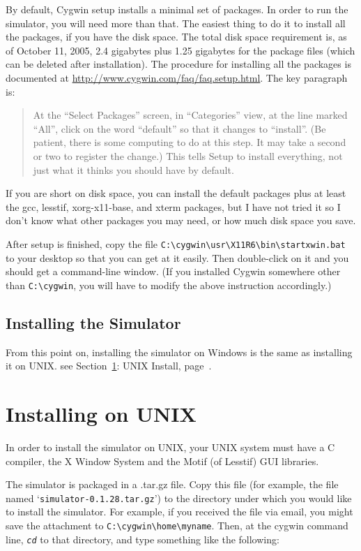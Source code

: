 \documentclass[12pt,openany,oneside]{book}
\newcommand{\tisamp}[1]{`\texttt{#1}'}
\newcommand{\tikbd}[1]{\textsl{\texttt{#1}}}
\newcommand{\tixref}[1]{see Section~\ref{#1}: #1, page~\pageref{#1}}
\begin{document}
By default, Cygwin setup installs a minimal set of packages.  In order
to run the simulator, you will need more than that.  The easiest thing
to do it to install all the packages, if you have the disk space.  The
total disk space requirement is, as of October 11, 2005, 2.4 gigabytes
plus 1.25 gigabytes for the package files (which can be deleted after
installation).  The procedure for installing all the packages is
documented at \url{http://www.cygwin.com/faq/faq.setup.html}.  The key
paragraph is:

\begin{quote}
At the ``Select Packages'' screen, in ``Categories'' view, at the line
marked ``All'', click on the word ``default'' so that it changes to
``install''. (Be patient, there is some computing to do at this
step. It may take a second or two to register the change.) This tells
Setup to install everything, not just what it thinks you should have
by default.
\end{quote}

If you are short on disk space, you can install the default packages
plus at least the gcc, lesstif, xorg-x11-base, and xterm packages, but
I have not tried it so I don't know what other packages you may need,
or how much disk space you save.

After setup is finished, copy the file
\verb-C:\cygwin\usr\X11R6\bin\startxwin.bat- to your desktop so that
you can get at it easily.  Then double-click on it and you should get
a command-line window.  (If you installed Cygwin somewhere other than
\verb-C:\cygwin-, you will have to modify the above instruction
accordingly.)

\subsection{Installing the Simulator}

From this point on, installing the simulator on Windows is the same as
installing it on UNIX.  \tixref{UNIX Install}.

\section{Installing on UNIX}\label{UNIX Install}

In order to install the simulator on UNIX, your UNIX system must have
a C compiler, the X Window System and the Motif (of Lesstif) GUI
libraries.

The simulator is packaged in a .tar.gz file.  Copy this file (for
example, the file named \tisamp{simulator-0.1.28.tar.gz}) to the directory under which
you would like to install the simulator.  For example, if you received
the file via email, you might save the attachment to
\verb-C:\cygwin\home\myname-. Then, at the cygwin command line,
\tikbd{cd} to that directory, and type something like the following:
\end{document}
